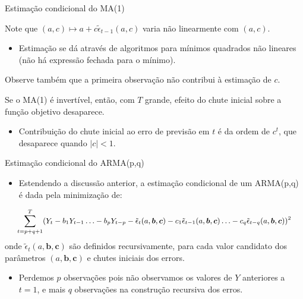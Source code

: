 \documentclass[11pt]{beamer}
\newenvironment{halfwideitemize}{\itemize\addtolength{\itemsep}{0.5em}}{\enditemize}
\begin{document}
\begin{frame}{Estimação condicional do MA(1)}
	\begin{halfwideitemize}
\item Note que $(a,c)\mapsto a + c\tilde{\epsilon}_{t-1}(a,c)$ varia não linearmente com $(a,c)$.
\begin{itemize}
	\item Estimação se dá através de algoritmos para mínimos quadrados não lineares (não há  expressão fechada para o mínimo).
\end{itemize}
\item Observe também que a primeira observação não contribui à estimação de $c$.
\item Se o MA(1) é {\color{blue}invertível}, então, com $T$ grande, efeito do chute inicial sobre a função objetivo desaparece.
\begin{itemize}
	\item Contribuição do chute inicial ao erro de previsão em $t$ é da ordem de $c^t$, que desaparece quando $|c| < 1$. 
\end{itemize}
	\end{halfwideitemize}
\end{frame}

\begin{frame}{Estimação condicional do ARMA(p,q)}
	\begin{itemize}
		\item Estendendo a discussão anterior, a estimação condicional de um ARMA(p,q) é dada pela minimização de:
\end{itemize}
		\begin{equation*}
			\small  \sum_{t= p+q+1}^{T}(Y_t -  b_1 Y_{t-1}  \ldots - b_p Y_{t-p} - \tilde{\epsilon}_t(a,\boldsymbol{b},\boldsymbol{c}) - c_1\tilde{\epsilon}_{t-1}(a,\boldsymbol{b},\boldsymbol{c}) \ldots -c_q \tilde{\epsilon}_{t-q}(a,\boldsymbol{b},\boldsymbol{c})  )^2
\end{equation*}
onde $\tilde{\epsilon}_t(a,\boldsymbol{b},\boldsymbol{c})$ são definidos recursivamente, para cada valor candidato dos parâmetros $(a,\boldsymbol{b},\boldsymbol{c})$ e chutes iniciais dos errors.
\begin{itemize}
	\item Perdemos $p$ observações pois não observamos os valores de $Y$ anteriores a $t=1$, e mais $q$ observações na construção recursiva dos erros.
\end{itemize}
\end{frame}
\end{document}
